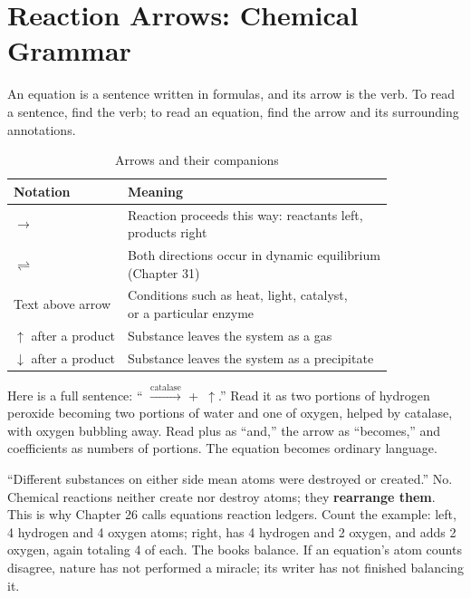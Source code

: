 \section{Reaction Arrows: Chemical Grammar}

An equation is a sentence written in formulas, and its arrow is the verb. To read a sentence, find the verb; to read an equation, find the arrow and its surrounding annotations.

\begin{table}[htbp]
\centering
\caption{Arrows and their companions}
\begin{tabular}{ll}
\toprule
Notation & Meaning \\
\midrule
$\rightarrow$ & \shortstack[l]{Reaction proceeds this way: reactants left,\\products right} \\
$\rightleftharpoons$ & \shortstack[l]{Both directions occur in dynamic equilibrium\\(Chapter 31)} \\
Text above arrow & \shortstack[l]{Conditions such as heat, light, catalyst,\\or a particular enzyme} \\
$\uparrow$ after a product & Substance leaves the system as a gas \\
$\downarrow$ after a product & Substance leaves the system as a precipitate \\
\bottomrule
\end{tabular}
\end{table}

Here is a full sentence: `` $\xrightarrow{\text{catalase}}$  + \,$\uparrow$.'' Read it as two portions of hydrogen peroxide becoming two portions of water and one of oxygen, helped by catalase, with oxygen bubbling away. Read plus as ``and,'' the arrow as ``becomes,'' and coefficients as numbers of portions. The equation becomes ordinary language.

\begin{wuqu}
``Different substances on either side mean atoms were destroyed or created.'' No. Chemical reactions neither create nor destroy atoms; they \textbf{rearrange them}. This is why Chapter 26 calls equations reaction ledgers. Count the example: left, 4 hydrogen and 4 oxygen atoms; right,  has 4 hydrogen and 2 oxygen, and  adds 2 oxygen, again totaling 4 of each. The books balance. If an equation's atom counts disagree, nature has not performed a miracle; its writer has not finished balancing it.
\end{wuqu}

